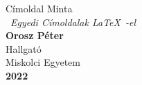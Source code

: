 \documentclass{book}
\begin{document}
	\begin{titlepage}
		\begin{center}
			{\Huge Címoldal Minta\\ \vspace{1cm}\ \textit{Egyedi Címoldalak \LaTeX\ -el}}\\
			\vspace{5cm}
			{\LARGE \textbf{Orosz Péter} \\ \vspace{0.5cm} Hallgató}\\
			\vspace{3cm}
			{\huge Miskolci Egyetem\\ \vspace{0.5cm}\textbf{2022}}
		\end{center}
	\end{titlepage}
\end{document}

